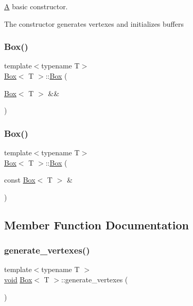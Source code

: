 \mbox{\hyperlink{classA}{A}} basic constructor. 

The constructor generates vertexes and initializes buffers \mbox{\label{classBox_af72b67fa2f421acbe9a7d3d1bcd540d1}} 
\subsubsection{\texorpdfstring{Box()}{Box()}\hspace{0.1cm}{\footnotesize\ttfamily [2/3]}}
{\footnotesize\ttfamily template$<$typename T$>$ \\
\mbox{\hyperlink{classBox}{Box}}$<$ T $>$\+::\mbox{\hyperlink{classBox}{Box}} (\begin{DoxyParamCaption}\item[{\mbox{\hyperlink{classBox}{Box}}$<$ T $>$ \&\&}]{ }\end{DoxyParamCaption})\hspace{0.3cm}{\ttfamily [default]}}

\mbox{\label{classBox_aab49a6687d04530ec60421bcbdb929c2}} 
\subsubsection{\texorpdfstring{Box()}{Box()}\hspace{0.1cm}{\footnotesize\ttfamily [3/3]}}
{\footnotesize\ttfamily template$<$typename T$>$ \\
\mbox{\hyperlink{classBox}{Box}}$<$ T $>$\+::\mbox{\hyperlink{classBox}{Box}} (\begin{DoxyParamCaption}\item[{const \mbox{\hyperlink{classBox}{Box}}$<$ T $>$ \&}]{ }\end{DoxyParamCaption})\hspace{0.3cm}{\ttfamily [default]}}



\subsection{Member Function Documentation}
\mbox{\label{classBox_a7f7b061bf913f9ab47bff75536bc137d}} 
\subsubsection{\texorpdfstring{generate\+\_\+vertexes()}{generate\_vertexes()}}
{\footnotesize\ttfamily template$<$typename T $>$ \\
\mbox{\hyperlink{glad_8h_a950fc91edb4504f62f1c577bf4727c29}{void}} \mbox{\hyperlink{classBox}{Box}}$<$ T $>$\+::generate\+\_\+vertexes (\begin{DoxyParamCaption}{ }\end{DoxyParamCaption})\hspace{0.3cm}{\ttfamily [private]}}




